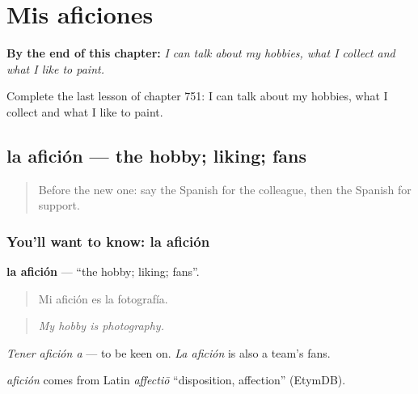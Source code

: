 
\chapter{Mis aficiones}
\label{ch:es-mis-aficiones}

\begin{chapteropening}
\textbf{By the end of this chapter:} \emph{I can talk about my hobbies, what I collect and what I like to paint.}

Complete the last lesson of chapter 751: I can talk about my hobbies, what I collect and what I like to paint.
\end{chapteropening}

\section[la afición]{la afición — the hobby; liking; fans}

\label{lesson:ES-C751-aficion}



\begin{quote}
Before the new one: say the Spanish for the colleague, then the Spanish for support.
\end{quote}

\subsection*{You'll want to know: la afición}
\textbf{la afición} — \textquotedblleft{}the hobby; liking; fans\textquotedblright{}.

\begin{quote}
Mi afición es la fotografía.
\end{quote}

\begin{quote}
\emph{My hobby is photography.}
\end{quote}

\emph{Tener afición a} — to be keen on. \emph{La afición} is also a team's fans.

\begin{cousinweb}
\emph{afición} comes from Latin \emph{affectiō} \textquotedblleft{}disposition, affection\textquotedblright{} (EtymDB).
\end{cousinweb}

